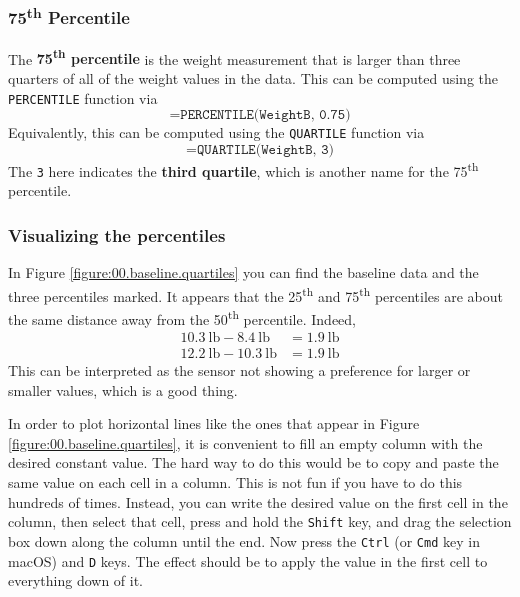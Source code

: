 \subsubsection{75\textsuperscript{th} Percentile}
%
The \textbf{75\textsuperscript{th} percentile} is the weight measurement that is larger than three quarters of all of the weight values in the data. This can be computed using the \texttt{PERCENTILE} function via
\begin{equation}
    \texttt{=PERCENTILE(WeightB, 0.75)}
    \label{eq:00.percentile.75}
\end{equation}
Equivalently, this can be computed using the \texttt{QUARTILE} function via
\begin{equation}
    \texttt{=QUARTILE(WeightB, 3)}
\end{equation}
The \texttt{3} here indicates the \textbf{third quartile}, which is another name for the 75\textsuperscript{th} percentile.
%
\subsubsection{Visualizing the percentiles}
%
In Figure \ref{figure:00.baseline.quartiles} you can find the baseline data and the three percentiles marked. It appears that the 25\textsuperscript{th} and 75\textsuperscript{th} percentiles are about the same distance away from the 50\textsuperscript{th} percentile. Indeed,
\begin{align}
    10.3 \ \text{lb} - 8.4 \ \text{lb} &= 1.9 \ \text{lb} \\
    12.2 \ \text{lb} - 10.3 \ \text{lb} &= 1.9 \ \text{lb}
\end{align}
This can be interpreted as the sensor not showing a preference for larger or smaller values, which is a good thing.

In order to plot horizontal lines like the ones that appear in Figure \ref{figure:00.baseline.quartiles}, it is convenient to fill an empty column with the desired constant value. The hard way to do this would be to copy and paste the same value on each cell in a column. This is not fun if you have to do this hundreds of times. Instead, you can write the desired value on the first cell in the column, then select that cell, press and hold the \texttt{Shift} key, and drag the selection box down along the column until the end. Now press the \texttt{Ctrl} (or \texttt{Cmd} key in macOS) and \texttt{D} keys. The effect should be to apply the value in the first cell to everything down of it.
%
